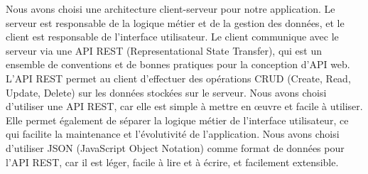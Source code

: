 Nous avons choisi une architecture client-serveur pour notre application. Le
serveur est responsable de la logique métier et de la gestion des données, et
le client est responsable de l'interface utilisateur. Le client communique avec
le serveur via une API REST (Representational State Transfer), qui est un
ensemble de conventions et de bonnes pratiques pour la conception d'API web.
L'API REST permet au client d'effectuer des opérations CRUD (Create, Read,
Update, Delete) sur les données stockées sur le serveur. Nous avons choisi
d'utiliser une API REST, car elle est simple à mettre en œuvre et facile à
utiliser. Elle permet également de séparer la logique métier de l'interface
utilisateur, ce qui facilite la maintenance et l'évolutivité de l'application.
Nous avons choisi d'utiliser JSON (JavaScript Object Notation) comme format de
données pour l'API REST, car il est léger, facile à lire et à écrire, et
facilement extensible.